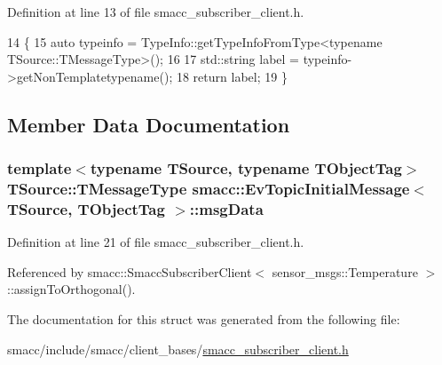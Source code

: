 Definition at line 13 of file smacc\+\_\+subscriber\+\_\+client.\+h.


\begin{DoxyCode}
14   \{
15     \textcolor{keyword}{auto} typeinfo = TypeInfo::getTypeInfoFromType<typename TSource::TMessageType>();
16 
17     std::string label = typeinfo->getNonTemplatetypename();
18     \textcolor{keywordflow}{return} label;
19   \}
\end{DoxyCode}


\subsection{Member Data Documentation}
\subsubsection[{\texorpdfstring{msg\+Data}{msgData}}]{\setlength{\rightskip}{0pt plus 5cm}template$<$typename T\+Source, typename T\+Object\+Tag$>$ T\+Source\+::\+T\+Message\+Type {\bf smacc\+::\+Ev\+Topic\+Initial\+Message}$<$ T\+Source, T\+Object\+Tag $>$\+::msg\+Data}\hypertarget{structsmacc_1_1EvTopicInitialMessage_a12015628fea3b4a0aa07e6a11fcffeda}{}\label{structsmacc_1_1EvTopicInitialMessage_a12015628fea3b4a0aa07e6a11fcffeda}


Definition at line 21 of file smacc\+\_\+subscriber\+\_\+client.\+h.



Referenced by smacc\+::\+Smacc\+Subscriber\+Client$<$ sensor\+\_\+msgs\+::\+Temperature $>$\+::assign\+To\+Orthogonal().



The documentation for this struct was generated from the following file\+:\begin{DoxyCompactItemize}
\item 
smacc/include/smacc/client\+\_\+bases/\hyperlink{smacc__subscriber__client_8h}{smacc\+\_\+subscriber\+\_\+client.\+h}\end{DoxyCompactItemize}
